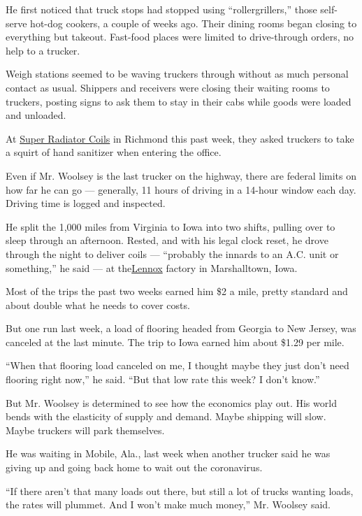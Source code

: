 He first noticed that truck stops had stopped using ``rollergrillers,''
those self-serve hot-dog cookers, a couple of weeks ago. Their dining
rooms began closing to everything but takeout. Fast-food places were
limited to drive-through orders, no help to a trucker.

Weigh stations seemed to be waving truckers through without as much
personal contact as usual. Shippers and receivers were closing their
waiting rooms to truckers, posting signs to ask them to stay in their
cabs while goods were loaded and unloaded.

At \href{https://www.superradiatorcoils.com/}{Super Radiator Coils} in
Richmond this past week, they asked truckers to take a squirt of hand
sanitizer when entering the office.

Even if Mr. Woolsey is the last trucker on the highway, there are
federal limits on how far he can go --- generally, 11 hours of driving
in a 14-hour window each day. Driving time is logged and inspected.

He split the 1,000 miles from Virginia to Iowa into two shifts, pulling
over to sleep through an afternoon. Rested, and with his legal clock
reset, he drove through the night to deliver coils --- ``probably the
innards to an A.C. unit or something,'' he said --- at
the\href{https://www.lennox.com/about}{Lennox} factory in Marshalltown,
Iowa.

Most of the trips the past two weeks earned him \$2 a mile, pretty
standard and about double what he needs to cover costs.

But one run last week, a load of flooring headed from Georgia to New
Jersey, was canceled at the last minute. The trip to Iowa earned him
about \$1.29 per mile.

``When that flooring load canceled on me, I thought maybe they just
don't need flooring right now,'' he said. ``But that low rate this week?
I don't know.''

But Mr. Woolsey is determined to see how the economics play out. His
world bends with the elasticity of supply and demand. Maybe shipping
will slow. Maybe truckers will park themselves.

He was waiting in Mobile, Ala., last week when another trucker said he
was giving up and going back home to wait out the coronavirus.

``If there aren't that many loads out there, but still a lot of trucks
wanting loads, the rates will plummet. And I won't make much money,''
Mr. Woolsey said.

